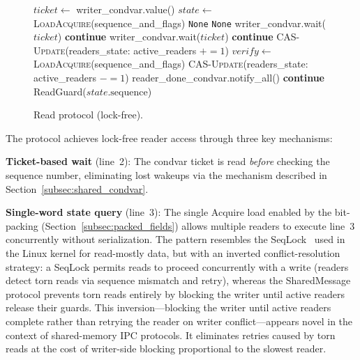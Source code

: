 \begin{figure}[htbp]
\begin{algorithmic}[1]
    \Loop
        \State $ticket \gets$ writer\_condvar.value() 
        \State $state \gets$ \textsc{LoadAcquire}(sequence\_and\_flags) 
            \State \Return \texttt{None} 
        \EndIf
             \Return \texttt{None} \EndIf
            \State writer\_condvar.wait($ticket$) 
            \State \textbf{continue}
        \EndIf
            \State writer\_condvar.wait($ticket$) 
            \State \textbf{continue}
        \EndIf
        \State \textsc{CAS-Update}(readers\_state: active\_readers $\mathrel{+}= 1$) 
        \State $verify \gets$ \textsc{LoadAcquire}(sequence\_and\_flags)
            \State \textsc{CAS-Update}(readers\_state: active\_readers $\mathrel{-}= 1$) 
            \State reader\_done\_condvar.notify\_all()
            \State \textbf{continue} 
        \EndIf
        \State \Return ReadGuard($state.\text{sequence}$) 
    \EndLoop
\EndFunction
\end{algorithmic}
\caption{Read protocol (lock-free).}
\label{alg:read}
\end{figure}

The protocol achieves lock-free reader access through three key mechanisms:

\textbf{Ticket-based wait} (line~2): The condvar ticket is read \emph{before} checking the sequence number, eliminating lost wakeups via the mechanism described in Section~\ref{subsec:shared_condvar}.

\textbf{Single-word state query} (line~3): The single Acquire load enabled by the bit-packing (Section~\ref{subsec:packed_fields}) allows multiple readers to execute line~3 concurrently without serialization. The pattern resembles the SeqLock~\cite{lameter2005seqlock} used in the Linux kernel for read-mostly data, but with an inverted conflict-resolution strategy: a SeqLock permits reads to proceed concurrently with a write (readers detect torn reads via sequence mismatch and retry), whereas the SharedMessage protocol prevents torn reads entirely by blocking the writer until active readers release their guards. This inversion---blocking the writer until active readers complete rather than retrying the reader on writer conflict---appears novel in the context of shared-memory IPC protocols. It eliminates retries caused by torn reads at the cost of writer-side blocking proportional to the slowest reader.

